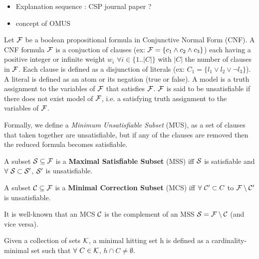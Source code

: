 
\begin{itemize}
    \item Explanation sequence : CSP journal paper ?
    \item concept of OMUS
\end{itemize}


Let $\mathcal{F}$ be a boolean propositional formula in Conjunctive Normal Form (CNF). A CNF formula $\mathcal{F}$ is a  conjuction of clauses  (ex: $\mathcal{F} = \{ c_1 \wedge c_2  \wedge c_3 \} $) each having a positive integer or infinite weight $w_i$ $\forall i \in \{1.. |C| \}$ with $|C|$ the number of clauses in $\mathcal{F}$.
Each clause is defined as a disjunction of literals (ex: $C_1 = \{ l_1 \vee l_2 \vee \lnot l_3 \}$).
A literal is defined as an atom or its negation (true or false).
A model is a truth assignment to the variables of $\mathcal{F}$ that satisfies $\mathcal{F}$.
$\mathcal{F}$ is said to be unsatisfiable if there does not exist model of $\mathcal{F}$, i.e. a satisfying truth assignment to the variables of $\mathcal{F}$.

Formally, we define a \textit{Minimum Unsatisfiable Subset} (MUS), as a set of clauses that taken together are unsatisfiable, but if any of the clauses are removed then the reduced formula becomes satisfiable.

\begin{definition}
    A subset $\mathcal{S} \subseteq \mathcal{F}$ is a \textbf{Maximal Satisfiable Subset} (MSS) iff $ \mathcal{S}$ is satisfiable and $\forall \ \mathcal{S}  \subset  \mathcal{S}' $, $\mathcal{S}'$ is unsatisfiable.
\end{definition}

\begin{definition}
    A subset $\mathcal{C} \subseteq \mathcal{F}$ is a \textbf{Minimal Correction Subset} (MCS) iff $ \forall \ \mathcal{C}' \subset C$ to $\mathcal{F} \setminus \mathcal{C}'$ is unsatisfiable.
\end{definition}

\noindent It is well-known that an MCS $\mathcal{C}$ is the complement of an MSS $\mathcal{S} = \mathcal{F} \setminus \mathcal{C}$ (and vice versa).

\begin{definition}\label{def:minimal-hs}
    Given a collection of sets $\mathcal{K}$, a minimal hitting set h is defined as a cardinality-minimal set such that $\forall \ C \in \mathcal{K}$, $h \cap C \neq \emptyset$.
\end{definition}

